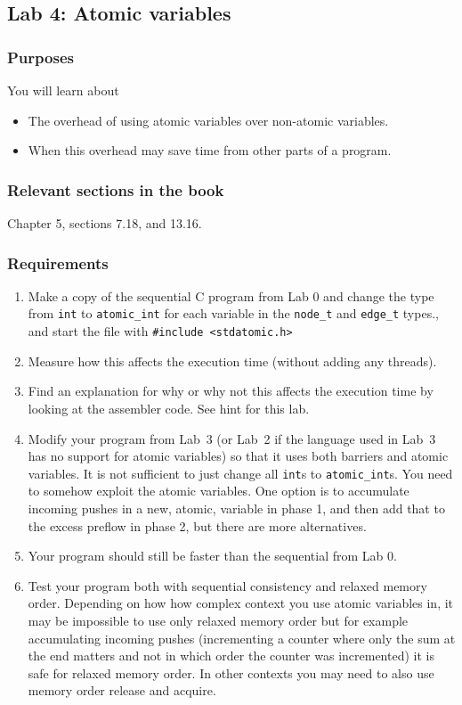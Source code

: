 \documentclass{forsete}
\begin{document}
\newpage
\subsection*{Lab 4: Atomic variables}
\subsubsection*{Purposes}
You will learn about
\begin{itemize}
\item The overhead of using atomic variables over non-atomic variables.
\item When this overhead may save time from other parts of a program.
\end{itemize}

\subsubsection*{Relevant sections in the book}
Chapter 5, sections 7.18, and 13.16.
\subsubsection*{Requirements}
\begin{enumerate}
\item Make a copy of the sequential C program from Lab 0 and change the
type from \verb.int. to \verb.atomic_int. for each variable in the 
\verb.node_t. and \verb.edge_t. types., and start the file with \verb!#include <stdatomic.h>!
\item Measure how this affects the execution time (without adding any threads).
\item Find an explanation for why or why not this affects the execution time by looking at the 
assembler code. See hint for this lab. 

\item Modify your program from Lab~3 (or Lab~2 if the language used in Lab~3 has no support for atomic variables)
so that it uses both barriers and atomic variables. It is not sufficient to just change all
\verb.int.s to \verb.atomic_int.s. You need to somehow exploit the atomic variables. One option is
to accumulate incoming pushes in a new, atomic, variable in phase 1, and then add that to the
excess preflow in phase 2, but there are more alternatives.
\item Your program should still be faster than the sequential from Lab 0.

\item Test your program both with sequential consistency and relaxed memory order. Depending on how
how complex context you use atomic variables in, it may be impossible to use only relaxed memory order but for
example accumulating incoming pushes (incrementing a counter where only the sum at the end matters
and not in which order the counter was incremented) it is safe for relaxed memory order. 
In other contexts you may need to also use memory order release and acquire.
\end{enumerate}
\end{document}
